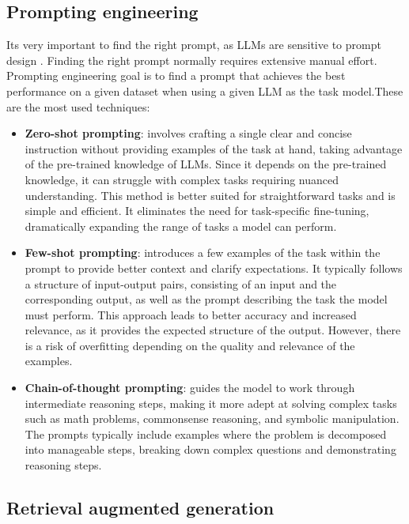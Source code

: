 \subsection{Prompting engineering }

Its very important to find the right prompt, as LLMs are sensitive to prompt design \cite{15BJiang2020}. Finding the right prompt normally requires extensive manual effort. Prompting engineering goal is to find a prompt that achieves the best performance on a given dataset when using a given LLM as the task model.These are the most used techniques:
\begin{itemize}
    \item \textbf{Zero-shot prompting}: involves crafting a single clear and concise instruction without providing examples of the task at hand, taking advantage of the pre-trained knowledge of LLMs. Since it depends on the pre-trained knowledge, it can struggle with complex tasks requiring nuanced understanding. This method is better suited for straightforward tasks and is simple and efficient. It eliminates the need for task-specific fine-tuning, dramatically expanding the range of tasks a model can perform.
    \item \textbf{Few-shot prompting}: introduces a few examples of the task within the prompt to provide better context and clarify expectations. It typically follows a structure of input-output pairs, consisting of an input and the corresponding output, as well as the prompt describing the task the model must perform. This approach leads to better accuracy and increased relevance, as it provides the expected structure of the output. However, there is a risk of overfitting depending on the quality and relevance of the examples.
    \item \textbf{Chain-of-thought prompting}: guides the model to work through intermediate reasoning steps, making it more adept at solving complex tasks such as math problems, commonsense reasoning, and symbolic manipulation. The prompts typically include examples where the problem is decomposed into manageable steps, breaking down complex questions and demonstrating reasoning steps.
\end{itemize}


\subsection{Retrieval augmented generation }

